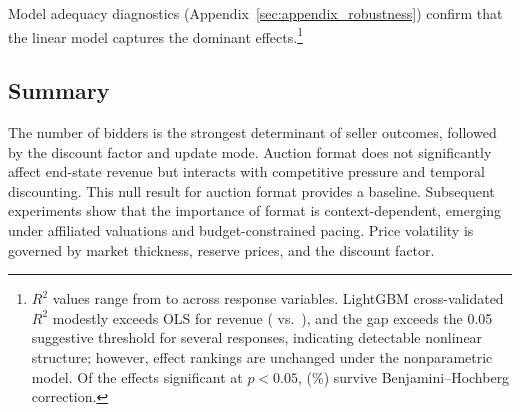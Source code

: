 Model adequacy diagnostics (Appendix~\ref{sec:appendix_robustness}) confirm that the linear model captures the dominant effects.\footnote{$R^2$ values range from \ExpOneRsqMin{} to \ExpOneRsqMax{} across response variables. LightGBM cross-validated $R^2$ modestly exceeds OLS for revenue (\ExpOneRevLGBMRsq{} vs.\ \ExpOneRevRsq), and the gap exceeds the 0.05 suggestive threshold for several responses, indicating detectable nonlinear structure; however, effect rankings are unchanged under the nonparametric model. Of the \ExpOneNRawSig{} effects significant at $p < 0.05$, \ExpOneNBHSig{} (\ExpOneBHPct\%) survive Benjamini--Hochberg correction.}

\subsection{Summary}

The number of bidders is the strongest determinant of seller outcomes, followed by the discount factor and update mode. Auction format does not significantly affect end-state revenue but interacts with competitive pressure and temporal discounting. This null result for auction format provides a baseline. Subsequent experiments show that the importance of format is context-dependent, emerging under affiliated valuations and budget-constrained pacing. Price volatility is governed by market thickness, reserve prices, and the discount factor.
